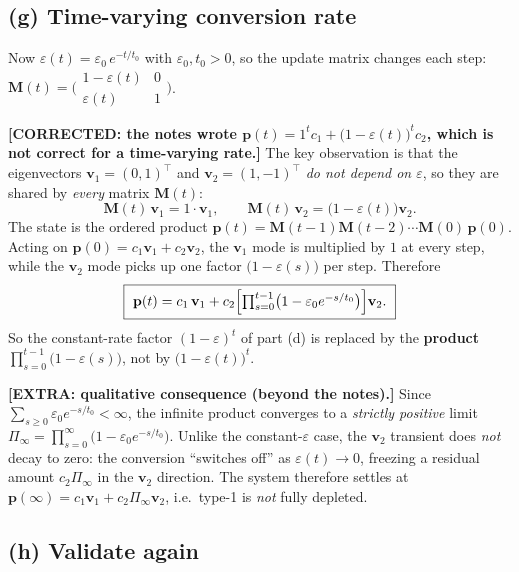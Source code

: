\documentclass[12pt,a4paper]{article}
\newcommand{\fix}[1]{{\textbf{\textcolor{orange!85!black}{[CORRECTED: #1]}}}}
\newcommand{\extra}[1]{{\textbf{\textcolor{blue!80!black}{[EXTRA: #1]}}}}
\theoremstyle{definition}
\newcommand{\Mx}{\mathbf{M}}
\newcommand{\vv}{\mathbf{v}}
\newcommand{\pp}{\mathbf{p}}
\newcommand{\T}{^{\!\top}}
\begin{document}
\subsection{(g) Time-varying conversion rate}

Now $\varepsilon(t)=\varepsilon_0\,e^{-t/t_0}$ with $\varepsilon_0,t_0>0$, so the
update matrix changes each step:
$\Mx(t)=\bigl(\begin{smallmatrix}1-\varepsilon(t) & 0\\ \varepsilon(t) & 1\end{smallmatrix}\bigr)$.

\fix{the notes wrote $\pp(t)=1^{t}c_1+\bigl(1-\varepsilon(t)\bigr)^{t}c_2$, which is
not correct for a time-varying rate.} The key observation is that the
eigenvectors $\vv_1=(0,1)\T$ and $\vv_2=(1,-1)\T$ \emph{do not depend on
$\varepsilon$}, so they are shared by \emph{every} matrix $\Mx(t)$:
\[
\Mx(t)\,\vv_1=1\cdot\vv_1,\qquad \Mx(t)\,\vv_2=\bigl(1-\varepsilon(t)\bigr)\vv_2 .
\]
The state is the ordered product $\pp(t)=\Mx(t-1)\Mx(t-2)\cdots\Mx(0)\,\pp(0)$.
Acting on $\pp(0)=c_1\vv_1+c_2\vv_2$, the $\vv_1$ mode is multiplied by $1$ at
every step, while the $\vv_2$ mode picks up one factor $\bigl(1-\varepsilon(s)\bigr)$
per step. Therefore
\[
\boxed{\ \pp(t)=c_1\,\vv_1+c_2\Bigl[\textstyle\prod_{s=0}^{t-1}\bigl(1-\varepsilon_0 e^{-s/t_0}\bigr)\Bigr]\vv_2.\ }
\]
So the constant-rate factor $(1-\varepsilon)^{t}$ of part (d) is replaced by the
\textbf{product} $\prod_{s=0}^{t-1}\bigl(1-\varepsilon(s)\bigr)$, not by
$\bigl(1-\varepsilon(t)\bigr)^{t}$.

\extra{qualitative consequence (beyond the notes).} Since
$\sum_{s\ge0}\varepsilon_0 e^{-s/t_0}<\infty$, the infinite product converges to a
\emph{strictly positive} limit $\Pi_\infty=\prod_{s=0}^{\infty}\bigl(1-\varepsilon_0 e^{-s/t_0}\bigr)$.
Unlike the constant-$\varepsilon$ case, the $\vv_2$ transient does \emph{not}
decay to zero: the conversion ``switches off'' as $\varepsilon(t)\to0$, freezing a
residual amount $c_2\Pi_\infty$ in the $\vv_2$ direction. The system therefore
settles at $\pp(\infty)=c_1\vv_1+c_2\Pi_\infty\vv_2$, i.e.\ type-1 is
\emph{not} fully depleted.

\subsection{(h) Validate again}
\end{document}
